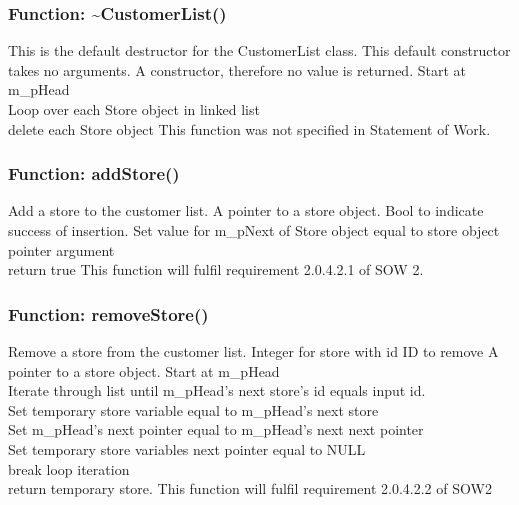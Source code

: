 \documentclass[12pt]{article}%
\newcounter{subsubsubsection}[subsubsection]
\begin{document}
\subsubsection{Function: \textasciitilde CustomerList()}
This is the default destructor for the CustomerList class.
This default constructor takes no arguments.
A constructor, therefore no value is returned.
Start at m\_pHead \\
Loop over each Store object in linked list \\
delete each Store object
This function was not specified in Statement of Work.

\subsubsection{Function: addStore()}
Add a store to the customer list.
A pointer to a store object.
Bool to indicate success of insertion.
Set value for m\_pNext of Store object equal to store object pointer argument \\
return true
This function will fulfil requirement 2.0.4.2.1 of SOW 2.

\subsubsection{Function: removeStore()}
Remove a store from the customer list.
Integer for store with id ID to remove
A pointer to a store object.
Start at m\_pHead \\
Iterate through list until m\_pHead's next store's id equals input id. \\
Set temporary store variable equal to m\_pHead's next store \\
Set m\_pHead's next pointer equal to m\_pHead's next next pointer\\
Set temporary store variables next pointer equal to NULL\\
break loop iteration \\
return temporary store.
This function will fulfil requirement 2.0.4.2.2 of SOW2
\end{document}
